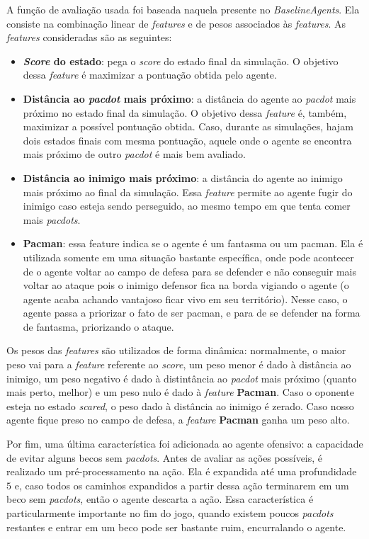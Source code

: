 \documentclass[a4paper,12pt]{article}
\begin{document}
A função de avaliação usada foi
baseada naquela presente no \textit{BaselineAgents}. Ela consiste na
combinação linear de \textit{features} e de pesos associados às \textit{features}.
As \textit{features} consideradas são as seguintes:

\begin{itemize}
  \item \textbf{\textit{Score} do estado}: pega o \textit{score} do
  estado final da simulação. O objetivo dessa \textit{feature} é maximizar a pontuação
  obtida pelo agente.
  \item \textbf{Distância ao \textit{pacdot} mais próximo}: a distância do agente ao \textit{pacdot}
  mais próximo no estado final da simulação. O objetivo dessa \textit{feature} é,
  também, maximizar a possível pontuação obtida. Caso, durante as simulações, hajam
  dois estados finais com mesma pontuação, aquele onde o agente se encontra
  mais próximo de outro \textit{pacdot} é mais bem avaliado.
  \item \textbf{Distância ao inimigo mais próximo}: a distância do agente ao inimigo
  mais próximo ao final da simulação. Essa \textit{feature} permite ao agente fugir
  do inimigo caso esteja sendo perseguido, ao mesmo tempo em que tenta comer mais
  \textit{pacdots}.
  \item \textbf{Pacman}: essa feature indica se o agente é um fantasma ou um
  pacman. Ela é utilizada somente em uma situação bastante específica, onde pode
  acontecer de o agente voltar ao campo de defesa para se defender e não conseguir
  mais voltar ao ataque pois o inimigo defensor fica na borda vigiando o agente (o
  agente acaba achando vantajoso ficar vivo em seu território).
  Nesse caso, o agente passa a priorizar o fato de ser pacman, e para de se defender
  na forma de fantasma, priorizando o ataque.
\end{itemize}

Os pesos das \textit{features} são utilizados de forma dinâmica: normalmente, o maior peso
vai para a \textit{feature} referente ao \textit{score}, um peso menor é dado à distância ao
inimigo, um peso negativo é dado à distintância ao \textit{pacdot} mais próximo (quanto mais perto,
melhor) e um peso nulo é dado à \textit{feature} \textbf{Pacman}. Caso o oponente esteja no
estado \textit{scared}, o peso dado à distância ao inimigo é zerado. Caso nosso agente fique preso
no campo de defesa, a \textit{feature} \textbf{Pacman} ganha um peso alto.

Por fim, uma última característica foi adicionada ao agente ofensivo: a capacidade de evitar
alguns becos sem \textit{pacdots}. Antes de avaliar as ações possíveis, é realizado um
pré-processamento na ação. Ela é expandida até uma profundidade $5$ e, caso todos os caminhos
expandidos a partir dessa ação terminarem em um beco sem \textit{pacdots}, então o agente descarta a
ação. Essa característica é particularmente importante no fim do jogo, quando existem poucos
\textit{pacdots} restantes e entrar em um beco pode ser bastante ruim, encurralando o agente.
\end{document}
